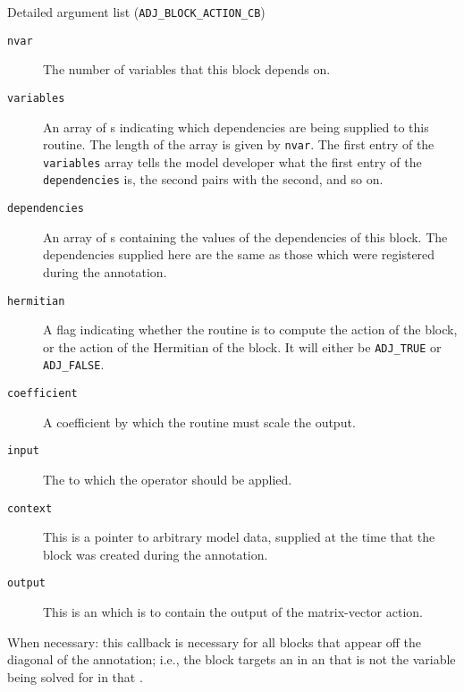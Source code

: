 \begin{boxwithtitle}{Detailed argument list (\texttt{ADJ_BLOCK_ACTION_CB})}
\begin{description}
\item[\texttt{nvar}] The number of variables that this block depends on.
\item[\texttt{variables}] An array of s indicating which dependencies are being supplied to this routine. The length of the
array is given by \texttt{nvar}. The first entry of the \texttt{variables} array
tells the model developer what the first entry of the \texttt{dependencies} is, the second pairs with the second, and so on.
\item[\texttt{dependencies}] An array of s containing the values of the dependencies of this block. The dependencies supplied
here are the same as those which were registered during the annotation.
\item[\texttt{hermitian}] A flag indicating whether the routine is to compute the action of the block, or the action of the Hermitian of the
block. It will either be \texttt{ADJ_TRUE} or \texttt{ADJ_FALSE}.
\item[\texttt{coefficient}] A coefficient by which the routine must scale the output.
\item[\texttt{input}] The  to which the operator should be applied.
\item[\texttt{context}] This is a pointer to arbitrary model data, supplied at the time that the block was created during the annotation.
\item[\texttt{output}] This is an  which is to contain the output of the matrix-vector action.
\end{description}
\end{boxwithtitle}

When necessary: this callback is necessary for all blocks that appear off the diagonal of the annotation; i.e., the block
targets an  in an  that is not the variable being solved for in that
.


